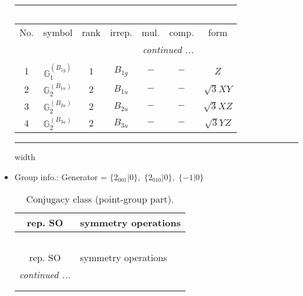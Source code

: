 \documentclass[fleqn,10pt,landscape]{article}
\begin{document}
\begin{itemize}
\begin{center}
\begin{longtable}{ccccccc}
\multicolumn{6}{l}{\tablename\ \thetable{}} \\
 \hline \hline
No. & symbol & rank & irrep. & mul. & comp. & form \\ \hline \endhead

 \hline \hline
\multicolumn{6}{r}{\footnotesize\it continued ...} \\ \endfoot

 \hline \hline
\multicolumn{6}{r}{} \\ \endlastfoot

$ 1 $ & $ \mathbb{G}_{1}^{(B_{1g})} $ & $ 1 $ & $ B_{1g} $ & $ - $ & $ - $ & $ Z $ \\ \hline
$ 2 $ & $ \mathbb{G}_{2}^{(B_{1u})} $ & $ 2 $ & $ B_{1u} $ & $ - $ & $ - $ & $ \sqrt{3} X Y $ \\
$ 3 $ & $ \mathbb{G}_{2}^{(B_{2u})} $ & $ 2 $ & $ B_{2u} $ & $ - $ & $ - $ & $ \sqrt{3} X Z $ \\
$ 4 $ & $ \mathbb{G}_{2}^{(B_{3u})} $ & $ 2 $ & $ B_{3u} $ & $ - $ & $ - $ & $ \sqrt{3} Y Z $ \\
\end{longtable}
\end{center}

 \hfil \hrule height 1mm width \textwidth \hfil

\item Group info.: Generator = $\{2{}_{001}|0\},\,\,\{2{}_{010}|0\},\,\,\{-1|0\}$

\begin{center}
\renewcommand{\arraystretch}{1.3}
\begin{longtable}{c|l}
\caption{Conjugacy class (point-group part).}
 \\
 \hline \hline
rep. SO & symmetry operations \\ \hline \endfirsthead

\multicolumn{1}{l}{\tablename\ \thetable{}} \\
 \hline \hline
rep. SO & symmetry operations \\ \hline \endhead

 \hline \hline
\multicolumn{1}{r}{\footnotesize\it continued ...} \\ \endfoot

 \hline \hline
\multicolumn{1}{r}{} \\ \endlastfoot


\end{longtable}
\end{center}
\end{itemize}
\end{document}
